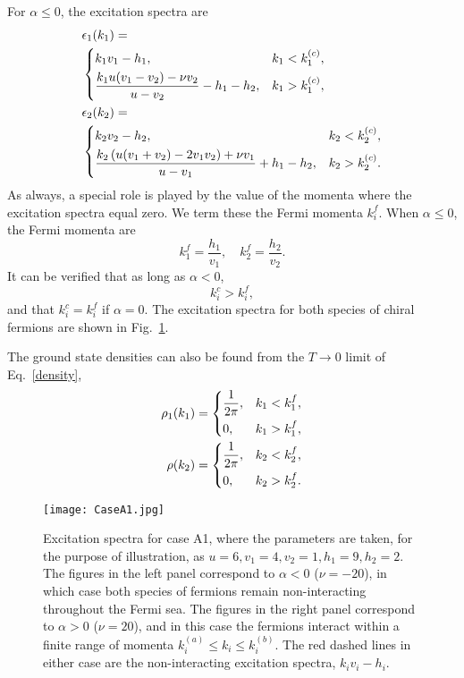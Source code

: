 \documentclass[aps,pra,
superscriptaddress,
reprint,twocolumn,preprintnumbers,
amsmath,amssymb,
nofootinbib]{revtex4-1}
\begin{document}
For $\alpha \leq 0$, the excitation spectra are
        \begin{align}
        &\epsilon_1(k_1) = \\
        &\begin{dcases}
		k_1 v_1 - h_1, & k_1<k_1^{(c)}, \\
	    \frac{k_1 u (v_1-v_2)-\nu v_2}{u-v_2} - h_1 - h_2, & k_1>k_1^{(c)},
		\end{dcases}\\
		&\epsilon_2(k_2) = \\
		&\begin{dcases}
		k_2 v_2 - h_2, &k_2<k_2^{(c)}, \\
		\frac{k_2 \left( u (v_1+v_2)-2 v_1 v_2 \right) + \nu v_1 }{u-v_1} + h_1-h_2, &k_2>k_2^{(c)}.
		\end{dcases}
        \end{align}
As always, a special role is played by the value of the momenta where the excitation spectra equal zero. We term these the Fermi momenta $k_i^f$. When $\alpha \le 0$, the Fermi momenta are
 \begin{equation}
 k_1^{f} = \frac{h_1}{v_1}, \quad  k_2^{f} = \frac{h_2}{v_2}.
 \end{equation}
 It can be verified that as long as $\alpha<0$,
 \begin{equation} k_i^{c} > k_i^f,
 \end{equation}
 and that $k_i^c=k_i^f$ if $\alpha=0$. The excitation spectra for both species of chiral fermions are shown in Fig.~\ref{fig:01}.

The ground state densities can also be found from the $T\to0$ limit of Eq.~\eqref{density},
        \begin{align}
        \rho_1(k_1) = 
        \begin{dcases}
        \frac{1}{2\pi}, &k_1<k_1^{f}, \\
        0, &k_1>k_1^{f},
        \end{dcases}\\
        \rho(k_2) = 
        \begin{dcases}
        \frac{1}{2\pi}, &k_2<k_2^{f}, \\
        0, &k_2>k_2^{f}.
        \end{dcases}
        \end{align}
        
    \begin{figure}[t]
    \texttt{[image: CaseA1.jpg]}
    \centering
    \caption{\label{fig:01} Excitation spectra for case A1, where the parameters are taken, for the purpose of illustration, as $u = 6,v_1 = 4,v_2 = 1,h_1 = 9,h_2 = 2$. The figures in the left panel correspond to $\alpha<0$ ($\nu = -20$), in which case both species of fermions remain non-interacting throughout the Fermi sea. The figures in the right panel correspond to $\alpha>0$ ($\nu = 20$), and in this case the fermions interact within a finite range of momenta $k_i^{(a)}\leq k_i \leq k_i^{(b)}$. The red dashed lines in either case are the non-interacting excitation spectra, $k_i v_i - h_i$.}
    \end{figure}        
\end{document}
